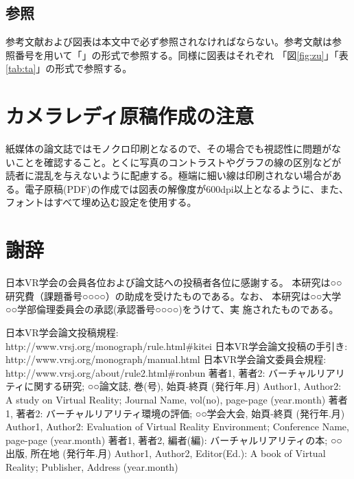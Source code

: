 \documentclass[a4paper,twoside]{jarticle}
\begin{document}
\subsection{参照}
参考文献および図表は本文中で必ず参照されなければならない。参考文献は参
照番号を用いて「\cite{bib1}」の形式で参照する。同様に図表はそれぞれ
「図\ref{fig:zu}」「表\ref{tab:ta}」の形式で参照する。

\section{カメラレディ原稿作成の注意}

紙媒体の論文誌ではモノクロ印刷となるので、その場合でも視認性に問題がな
いことを確認すること。とくに写真のコントラストやグラフの線の区別などが
読者に混乱を与えないように配慮する。極端に細い線は印刷されない場合があ
る。電子原稿(PDF)の作成では図表の解像度が600dpi以上となるように、また、
フォントはすべて埋め込む設定を使用する。

\section*{謝辞}
日本VR学会の会員各位および論文誌への投稿者各位に感謝する。
本研究は○○研究費（課題番号○○○○）の助成を受けたものである。なお、
本研究は○○大学○○学部倫理委員会の承認(承認番号○○○○)をうけて、実
施されたものである。

\begin{thebibliography}{99}
日本VR学会論文投稿規程:\\
http://www.vrsj.org/monograph/rule.html\#kitei
日本VR学会論文投稿の手引き:\\
http://www.vrsj.org/monograph/manual.html
日本VR学会論文委員会規程:\\
http://www.vrsj.org/about/rule2.html\#ronbun
著者1, 著者2: バーチャルリアリティに関する研究; ○○論文誌, 巻(号), 
始頁-終頁 (発行年.月)
Author1, Author2: A study on Virtual Reality; Journal Name, vol(no), 
page-page (year.month)
著者1, 著者2: バーチャルリアリティ環境の評価; ○○学会大会, 始頁-終頁 
(発行年.月)
Author1, Author2: Evaluation of Virtual Reality Environment;
Conference Name, page-page (year.month)
著者1, 著者2, 編者(編): バーチャルリアリティの本; ○○出版, 所在地 (発行年.月)
Author1, Author2, Editor(Ed.): A book of Virtual Reality; Publisher, Address (year.month)
\end{thebibliography}
\end{document}
